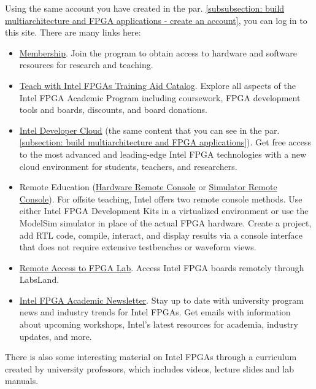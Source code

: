 \documentclass[a4paper]{article}
\begin{document}
    \noindent
    Using the same account you have created in the par. \ref{subsubsection: build multiarchitecture and FPGA applications - create an account}, you can log in to this site. There are many links here:
    \begin{itemize}
        \item \href{https://www.intel.com/content/www/us/en/developer/topic-technology/fpga-academic/membership.html}{Membership}. Join the program to obtain access to hardware and software resources for research and teaching.

        \item \href{https://cdrdv2.intel.com/v1/dl/getContent/685254}{Teach with Intel FPGAs Training Aid Catalog}. Explore all aspects of the Intel FPGA Academic Program including coursework, FPGA development tools and boards, discounts, and board donations.
        
        \item \href{https://www.intel.com/content/www/us/en/developer/tools/devcloud/overview.html}{Intel Developer Cloud} (the same content that you can see in the par. \ref{subsection: build multiarchitecture and FPGA applications}). Get free access to the most advanced and leading-edge Intel FPGA technologies with a new cloud environment for students, teachers, and researchers.
        
        \item Remote Education (\href{https://github.com/intel/FPGA-Devcloud/tree/master/main/HandsFree}{Hardware Remote Console} or \href{https://github.com/fpgacademy/DESim}{Simulator Remote Console}). For offsite teaching, Intel offers two remote console methods. Use either Intel FPGA Development Kits in a virtualized environment or use the ModelSim simulator in place of the actual FPGA hardware. Create a project, add RTL code, compile, interact, and display results via a console interface that does not require extensive testbenches or waveform views.
        
        \item \href{https://labsland.com/web/intel}{Remote Access to FPGA Lab}. Access Intel FPGA boards remotely through LabsLand.
        
        \item \href{https://plan.seek.intel.com/fpga-academic}{Intel FPGA Academic Newsletter}. Stay up to date with university program news and industry trends for Intel FPGAs. Get emails with information about upcoming workshops, Intel's latest resources for academia, industry updates, and more.
    \end{itemize}
    There is also some interesting material on Intel FPGAs through a curriculum created by university professors, which includes videos, lecture slides and lab manuals.
\end{document}
